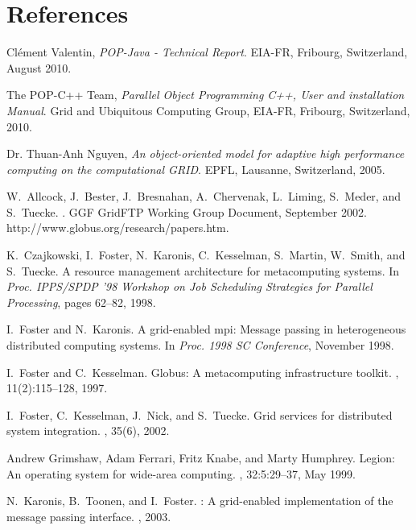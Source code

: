 \documentclass[a4paper, 11pt]{article}
\begin{document}
\section{References}
\begin{thebibliography}{9}

	Clément Valentin,
  	\emph{POP-Java - Technical Report}.
	EIA-FR, Fribourg, Switzerland,
	August 2010.

	The POP-C++ Team,
  	\emph{Parallel Object Programming C++, User and installation Manual}.
	Grid and Ubiquitous Computing Group, EIA-FR, Fribourg, Switzerland,
	2010.

	Dr. Thuan-Anh Nguyen,
  	\emph{An object-oriented model for adaptive high performance computing on the computational GRID}.
	EPFL, Lausanne, Switzerland,
	2005.

W.~Allcock, J.~Bester, J.~Bresnahan, A.~Chervenak, L.~Liming, S.~Meder, and
  S.~Tuecke.
.
\newblock GGF GridFTP Working Group Document, September 2002.
\newblock http://www.globus.org/research/papers.htm.

K.~Czajkowski, I.~Foster, N.~Karonis, C.~Kesselman, S.~Martin, W.~Smith, and
  S.~Tuecke.
\newblock A resource management architecture for metacomputing systems.
\newblock In {\em Proc. IPPS/SPDP '98 Workshop on Job Scheduling Strategies for
  Parallel Processing}, pages 62--82, 1998.

I.~Foster and N.~Karonis.
\newblock A grid-enabled mpi: Message passing in heterogeneous distributed
  computing systems.
\newblock In {\em Proc. 1998 SC Conference}, November 1998.

I.~Foster and C.~Kesselman.
\newblock Globus: A metacomputing infrastructure toolkit.
, 11(2):115--128, 1997.

I.~Foster, C.~Kesselman, J.~Nick, and S.~Tuecke.
\newblock Grid services for distributed system integration.
, 35(6), 2002.

Andrew Grimshaw, Adam Ferrari, Fritz Knabe, and Marty Humphrey.
\newblock Legion: An operating system for wide-area computing.
, 32:5:29--37, May 1999.

N.~Karonis, B.~Toonen, and I.~Foster.
: A grid-enabled implementation of the message passing
  interface.
, 2003.


\end{thebibliography}
\end{document}
